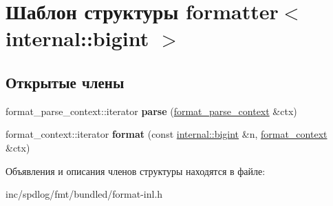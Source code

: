 \hypertarget{structformatter_3_01internal_1_1bigint_01_4}{}\section{Шаблон структуры formatter$<$ internal\+:\+:bigint $>$}
\label{structformatter_3_01internal_1_1bigint_01_4}
\subsection*{Открытые члены}
\begin{DoxyCompactItemize}
\item 
\mbox{\label{structformatter_3_01internal_1_1bigint_01_4_a72756618ecd059dff10a24f456722563}} 
format\+\_\+parse\+\_\+context\+::iterator {\bfseries parse} (\hyperlink{classbasic__format__parse__context}{format\+\_\+parse\+\_\+context} \&ctx)
\item 
\mbox{\label{structformatter_3_01internal_1_1bigint_01_4_a21e4d55b3e498bec0cf30a4043b35a6d}} 
format\+\_\+context\+::iterator {\bfseries format} (const \hyperlink{classinternal_1_1bigint}{internal\+::bigint} \&n, \hyperlink{classbasic__format__context}{format\+\_\+context} \&ctx)
\end{DoxyCompactItemize}


Объявления и описания членов структуры находятся в файле\+:\begin{DoxyCompactItemize}
\item 
inc/spdlog/fmt/bundled/format-\/inl.\+h\end{DoxyCompactItemize}
